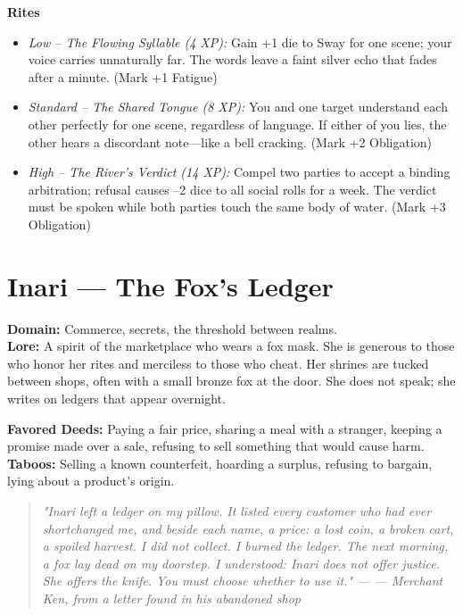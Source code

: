 \documentclass[12pt]{book}
\newcommand{\letter}[2]{%
    \begin{quote}\small\itshape #1 \hfill --- #2\end{quote}}
\begin{document}
\begin{infobox}
\textbf{Rites}
\begin{itemize}
    \item \textit{Low -- The Flowing Syllable (4 XP):} Gain +1 die to Sway for one scene; your voice carries unnaturally far. The words leave a faint silver echo that fades after a minute. (Mark +1 Fatigue)
    \item \textit{Standard -- The Shared Tongue (8 XP):} You and one target understand each other perfectly for one scene, regardless of language. If either of you lies, the other hears a discordant note---like a bell cracking. (Mark +2 Obligation)
    \item \textit{High -- The River's Verdict (14 XP):} Compel two parties to accept a binding arbitration; refusal causes --2 dice to all social rolls for a week. The verdict must be spoken while both parties touch the same body of water. (Mark +3 Obligation)
\end{itemize}
\end{infobox}

\section{Inari --- The Fox's Ledger}
\noindent\textbf{Domain:} Commerce, secrets, the threshold between realms.\\
\textbf{Lore:} A spirit of the marketplace who wears a fox mask. She is generous to those who honor her rites and merciless to those who cheat. Her shrines are tucked between shops, often with a small bronze fox at the door. She does not speak; she writes on ledgers that appear overnight.

\textbf{Favored Deeds:} Paying a fair price, sharing a meal with a stranger, keeping a promise made over a sale, refusing to sell something that would cause harm.\\
\textbf{Taboos:} Selling a known counterfeit, hoarding a surplus, refusing to bargain, lying about a product's origin.

\letter{"Inari left a ledger on my pillow. It listed every customer who had ever shortchanged me, and beside each name, a price: a lost coin, a broken cart, a spoiled harvest. I did not collect. I burned the ledger. The next morning, a fox lay dead on my doorstep. I understood: Inari does not offer justice. She offers the knife. You must choose whether to use it."}{--- Merchant Ken, from a letter found in his abandoned shop}
\end{document}
